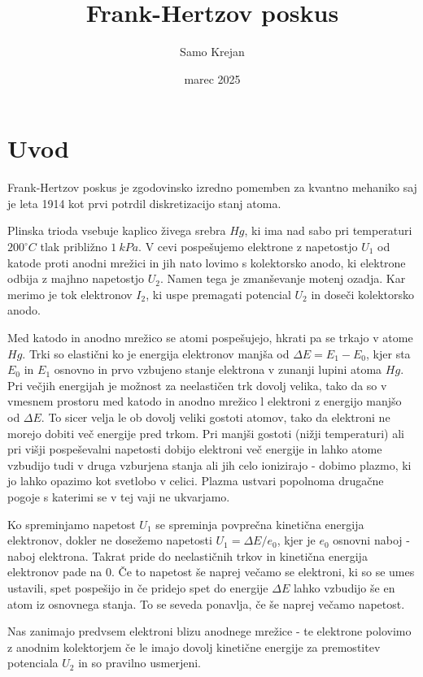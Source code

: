 \documentclass[10pt]{article}
\title{Frank-Hertzov poskus}
\author{Samo Krejan}
\date{marec 2025}
\begin{document}
\maketitle

\section{Uvod}

Frank-Hertzov poskus je zgodovinsko izredno pomemben za kvantno mehaniko saj je leta 1914 kot prvi potrdil diskretizacijo stanj atoma.

Plinska trioda vsebuje kaplico živega srebra $Hg$, ki ima nad sabo pri temperaturi $200^{\circ}C$ tlak približno $1 \ kPa$. V cevi pospešujemo elektrone z napetostjo $U_1$ od katode proti anodni mrežici in jih nato lovimo s kolektorsko anodo, ki elektrone odbija z majhno napetostjo $U_2$. Namen tega je zmanševanje motenj ozadja. Kar merimo je tok elektronov $I_2$, ki uspe premagati potencial $U_2$ in doseči kolektorsko anodo.

Med katodo in anodno mrežico se atomi pospešujejo, hkrati pa se trkajo v atome $Hg$. Trki so elastični ko je energija elektronov manjša od $\Delta E = E_1 - E_0$, kjer sta $E_0$ in $E_1$ osnovno in prvo vzbujeno stanje elektrona v zunanji lupini atoma $Hg$. Pri večjih energijah je možnost za neelastičen trk dovolj velika, tako da so v vmesnem prostoru med katodo in anodno mrežico l elektroni z energijo manjšo od $\Delta E$. To sicer velja le ob dovolj veliki gostoti atomov, tako da elektroni ne morejo dobiti več energije pred trkom. Pri manjši gostoti (nižji temperaturi) ali pri višji pospeševalni napetosti dobijo elektroni več energije in lahko atome vzbudijo tudi v druga vzburjena stanja ali jih celo ionizirajo - dobimo plazmo, ki jo lahko opazimo kot svetlobo v celici. Plazma ustvari popolnoma drugačne pogoje s katerimi se v tej vaji ne ukvarjamo.

Ko spreminjamo napetost $U_1$ se spreminja povprečna kinetična energija elektronov, dokler ne dosežemo napetosti $U_1 = \Delta E / e_0$, kjer je $e_0$ osnovni naboj - naboj elektrona. Takrat pride do neelastičnih trkov in kinetična energija elektronov pade na $0$. Če to napetost še naprej večamo se elektroni, ki so se umes ustavili, spet pospešijo in če pridejo spet do energije $\Delta E$ lahko vzbudijo še en atom iz osnovnega stanja. To se seveda ponavlja, če še naprej večamo napetost.

Nas zanimajo predvsem elektroni blizu anodnege mrežice - te elektrone polovimo z anodnim kolektorjem če le imajo dovolj kinetične energije za premostitev potenciala $U_2$ in so pravilno usmerjeni.
\end{document}
